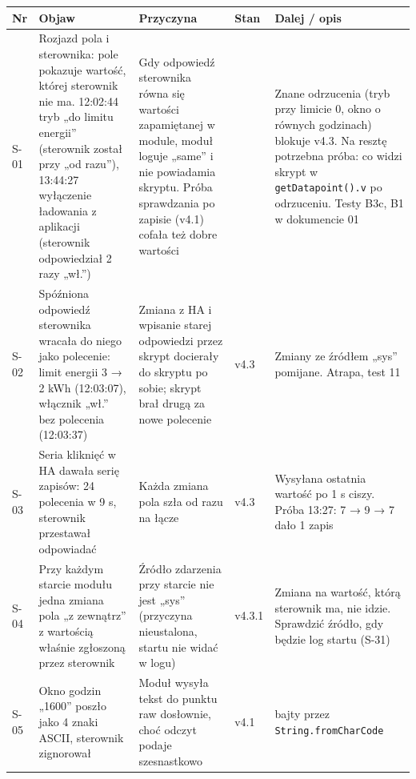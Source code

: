 \documentclass[11pt,a4paper]{article}
\begin{document}
\begin{longtable}{>{\raggedright\arraybackslash}p{3.00cm}>{\raggedright\arraybackslash}p{3.43cm}>{\raggedright\arraybackslash}p{3.43cm}>{\raggedright\arraybackslash}p{1.10cm}>{\raggedright\arraybackslash}p{3.43cm}}
\toprule
\rowcolor{apteallight}\textbf{Nr} & \textbf{Objaw} & \textbf{Przyczyna} & \textbf{Stan} & \textbf{Dalej / opis} \\
\midrule\endhead
\bottomrule\endfoot
S-01 & Rozjazd pola i sterownika: pole pokazuje wartość, której sterownik nie ma. 12:02:44 tryb „do limitu energii” (sterownik został przy „od razu”), 13:44:27 wyłączenie ładowania z aplikacji (sterownik odpowiedział 2 razy „wł.”) & Gdy odpowiedź sterownika równa się wartości zapamiętanej w module, moduł loguje „same” i nie powiadamia skryptu. Próba sprawdzania po zapisie (v4.1) cofała też dobre wartości & \leavevmode{\symbolfont\color{apred}\textbf{✘}} & Znane odrzucenia (tryb przy limicie 0, okno o równych godzinach) blokuje v4.3. Na resztę potrzebna próba: co widzi skrypt w \texttt{getDatapoint().\allowbreak{}v} po odrzuceniu. Testy B3c, B1 w dokumencie 01 \\
S-02 & Spóźniona odpowiedź sterownika wracała do niego jako polecenie: limit energii 3 {\symbolfont→} 2 kWh (12:03:07), włącznik „wł.” bez polecenia (12:03:37) & Zmiana z HA i wpisanie starej odpowiedzi przez skrypt docierały do skryptu po sobie; skrypt brał drugą za nowe polecenie & \leavevmode{\symbolfont\color{apgreen}\textbf{✔}} v4.3 & Zmiany ze źródłem „sys” pomijane. Atrapa, test 11 \\
S-03 & Seria kliknięć w HA dawała serię zapisów: 24 polecenia w 9 s, sterownik przestawał odpowiadać & Każda zmiana pola szła od razu na łącze & \leavevmode{\symbolfont\color{apgreen}\textbf{✔}} v4.3 & Wysyłana ostatnia wartość po 1 s ciszy. Próba 13:27: 7 {\symbolfont→} 9 {\symbolfont→} 7 dało 1 zapis \\
S-04 & Przy każdym starcie modułu jedna zmiana pola „z zewnątrz” z wartością właśnie zgłoszoną przez sterownik & Źródło zdarzenia przy starcie nie jest „sys” (przyczyna nieustalona, startu nie widać w logu) & \leavevmode{\symbolfont\color{apgreen}\textbf{✔}} v4.3.1 & Zmiana na wartość, którą sterownik ma, nie idzie. Sprawdzić źródło, gdy będzie log startu (S-31) \\
S-05 & Okno godzin „1600” poszło jako 4 znaki ASCII, sterownik zignorował & Moduł wysyła tekst do punktu raw dosłownie, choć odczyt podaje szesnastkowo & \leavevmode{\symbolfont\color{apgreen}\textbf{✔}} v4.1 & 2 bajty przez \texttt{String.\allowbreak{}fromCharCode} \\

\end{longtable}
\end{document}
